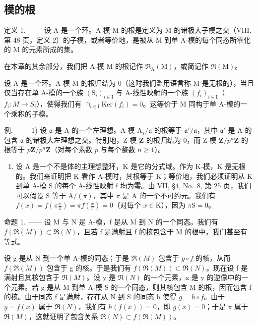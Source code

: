 \subsection{模的根}

定义 1. —— 设 A 是一个环。A-模 M 的根是定义为 M 的诸极大子模之交（VIII, 第 48 页，定义 2）的子模，或者等价地，是被从 M 到单 A-模的每个同态所零化的 M 的元素所成的集。

在本章的其余部分，我们把 A-模 M 的根记作 \(\mathfrak{R}_{\mathrm{A}}(\mathrm{M})\)，或简记作 \(\mathfrak{R}(\mathrm{M})\)。

设 A 是一个环。A-模 M 的根归结为 0（这时我们滥用语言称 M 是无根的），当且仅当存在单 A-模的一个族 \((\mathrm{S}_{i})_{i\in\mathrm{I}}\) 与 A-线性映射的一个族 \((f_{i})_{i\in\mathrm{I}}\)（\(f_{i}:M\to S_{i}\)），使得我们有 \(\cap_{i\in\mathrm{I}}\mathrm{Ker}(f_{i})=0\)。这等价于 M 同构于单 A-模的一个乘积的子模。

例. —— 1) 设 \(\mathfrak{a}\) 是 A 的一个左理想。A-模 \(\mathrm{A}_s / \mathfrak{a}\) 的根等于 \(\mathfrak{a}' / \mathfrak{a}\)，其中 \(\mathfrak{a}'\) 是 A 的包含 \(\mathfrak{a}\) 的诸极大左理想之交。特别地，Z-模 \(\mathbf{Z}\) 的根归结为 0，而 Z-模 \(\mathbf{Z} / p^n\mathbf{Z}\) 的根等于 \(p\mathbf{Z} / p^n\mathbf{Z}\)（对每个素数 \(p\) 与每个整数 \(n \geqslant 1\)）。

\begin{enumerate}
\def\labelenumi{\arabic{enumi})}
\setcounter{enumi}{1}
\tightlist
\item
  设 A 是一个不是体的主理想整环，K 是它的分式域。作为 K-模，K 是无根的。我们来证明把 K 看作 A-模时，其根等于 K；等价地，我们必须证明从 K 到单 A-模 S 的每个 A-线性映射 f 均为零。由 VII, §4, No.~8, 第 25 页，我们可以假设 S 等于 \(\mathrm{A}/(\pi)\)，其中 \(\pi\) 是 A 的一个不可约元。我们有 \(f(x) = f\left(\pi \frac{x}{\pi}\right) = \pi f\left(\frac{x}{\pi}\right) = 0\)（对每个 \(x \in \mathrm{K}\)），因为 \(\pi \mathrm{S} = 0\)。
\end{enumerate}

命题 1. —— 设 M 与 N 是 A-模，f 是从 M 到 N 的一个同态。我们有 \(f(\mathfrak{R}(M)) \subset \mathfrak{R}(N)\)，且若 f 是满射且 f 的核包含于 M 的根中，我们甚至有等式。

设 g 是从 N 到一个单 A-模的同态；于是 \(\mathfrak{R}(M)\) 包含于 \(g \circ f\) 的核，从而 \(f(\mathfrak{R}(M))\) 包含于 g 的核。于是我们有 \(f(\mathfrak{R}(M)) \subset \mathfrak{R}(N)\)。现在设 f 是满射且其核包含于 \(\mathfrak{R}(M)\)。设 y 是 \(\mathfrak{R}(N)\) 的一个元素，x 是 y 的逆像中的一个元素。若 g 是从 M 到单 A-模 S 的一个同态，则其核包含 M 的根，因而包含 f 的核。由于同态 f 是满射，存在从 N 到 S 的同态 h 使得 \(g = h \circ f\)。由于 \(y = f(x)\) 属于 \(\mathfrak{R}(N)\)，我们有 \(h(f(x)) = 0\)，即 \(g(x) = 0\)；于是 x 属于 \(\mathfrak{R}(M)\)，这就证明了包含关系 \(\mathfrak{R}(N) \subset f(\mathfrak{R}(M))\)。


